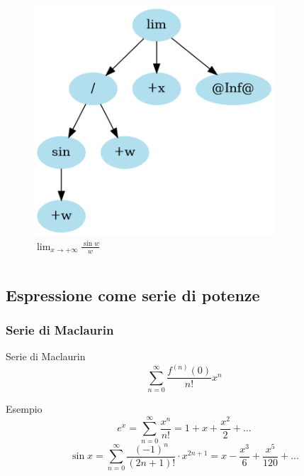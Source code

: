 \documentclass[aspectratio=149]{beamer}
\begin{document}
\begin{frame}
\begin{columns}
\begin{column}{0.45\textwidth}
\begin{figure}
					\includegraphics[width=0.8\textwidth]{pres_img/replaced2.png}
					\caption{\(\lim_{x \to +\infty}{\frac{\sin{w}}{w}}\)}
				\end{figure}
			\end{column}
		\end{columns}
	\end{frame}

	\subsection{Espressione come serie di potenze}
	
	\begin{frame}
		\frametitle{Serie di Maclaurin}
		\begin{block}{Serie di Maclaurin}
			\[
			\sum_{n=0}^{\infty}{\frac{f^{(n)}(0)}{n!} x^{n}}
			\] 
		\end{block}
		\begin{exampleblock}{Esempio}
			\[
				e^{x} = \sum_{n=0}^{\infty} \frac{x^{n}}{n!} = 1 + x + \frac{x^2}{2} + ...
			\]
			\[
				\sin{x} = \sum_{n=0}^{\infty} \frac{(-1)^{n}}{(2n + 1)!} \cdot x^{2n+1} = x - \frac{x^3}{6} + \frac{x^5}{120} + ...
			\]
		\end{exampleblock}
	\end{frame}
\end{document}
